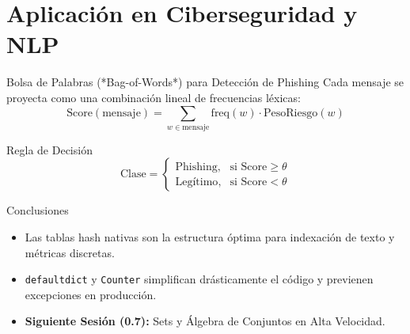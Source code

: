 \documentclass[aspectratio=169]{beamer}
\begin{document}
\section{Aplicación en Ciberseguridad y NLP}

\begin{frame}{Bolsa de Palabras (*Bag-of-Words*) para Detección de Phishing}
    Cada mensaje se proyecta como una combinación lineal de frecuencias léxicas:
    \begin{equation*}
        \text{Score}(\text{mensaje}) = \sum_{w \in \text{mensaje}} \text{freq}(w) \cdot \text{PesoRiesgo}(w)
    \end{equation*}
    \begin{block}{Regla de Decisión}
        \begin{equation*}
            \text{Clase} = \begin{cases}
                \text{Phishing}, & \text{si } \text{Score} \ge \theta \\
                \text{Legítimo}, & \text{si } \text{Score} < \theta
            \end{cases}
        \end{equation*}
    \end{block}
\end{frame}

\begin{frame}{Conclusiones}
    \begin{itemize}
        \item Las tablas hash nativas son la estructura óptima para indexación de texto y métricas discretas.
        \item \texttt{defaultdict} y \texttt{Counter} simplifican drásticamente el código y previenen excepciones en producción.
        \item \textbf{Siguiente Sesión (0.7):} Sets y Álgebra de Conjuntos en Alta Velocidad.
    \end{itemize}
\end{frame}
\end{document}
